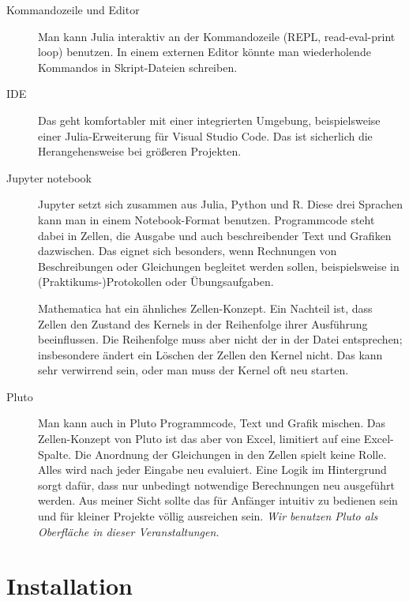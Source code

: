 \begin{description}
\item[Kommandozeile und Editor] Man kann Julia interaktiv an der Kommandozeile (REPL, read-eval-print loop) benutzen. In einem externen Editor  könnte man wiederholende Kommandos in Skript-Dateien schreiben.

\item[IDE] Das geht komfortabler mit einer integrierten Umgebung, beispielsweise einer Julia-Erweiterung 
für Visual Studio Code. Das ist sicherlich die Herangehensweise bei  größeren Projekten.

\item[Jupyter notebook] Jupyter setzt sich zusammen aus Julia, Python und R. Diese drei Sprachen kann man in einem Notebook-Format benutzen. Programmcode steht dabei in Zellen, die Ausgabe und auch beschreibender Text und Grafiken dazwischen. Das eignet sich besonders, wenn Rechnungen von Beschreibungen oder Gleichungen begleitet werden sollen, beispielsweise in (Praktikums-)Protokollen oder Übungsaufgaben. 

Mathematica hat ein ähnliches Zellen-Konzept. Ein Nachteil ist, dass Zellen den Zustand des Kernels in der Reihenfolge ihrer Ausführung beeinflussen. Die Reihenfolge muss aber nicht der in der Datei entsprechen; insbesondere ändert ein Löschen der Zellen den Kernel nicht. Das kann sehr verwirrend sein, oder man muss der Kernel oft neu starten.

\item[Pluto]  Man kann auch in Pluto Programmcode, Text und Grafik mischen. Das Zellen-Konzept von Pluto ist das aber von Excel, limitiert auf eine Excel-Spalte. Die Anordnung der Gleichungen in den Zellen spielt keine Rolle. Alles wird nach jeder Eingabe neu evaluiert. Eine Logik im Hintergrund sorgt dafür, dass nur unbedingt notwendige Berechnungen neu ausgeführt werden. Aus meiner Sicht sollte das für Anfänger intuitiv zu bedienen sein und für kleiner Projekte völlig ausreichen sein. \emph{Wir benutzen Pluto als Oberfläche in dieser Veranstaltungen.}

\end{description}



\section{Installation}


